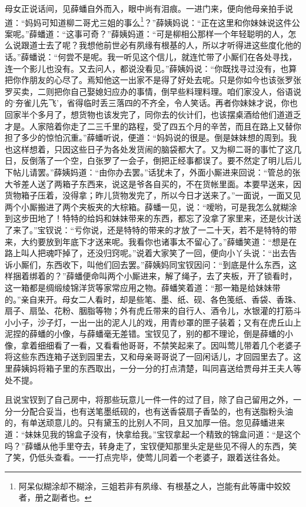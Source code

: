 \documentclass[12pt,oneside]{book}
\begin{document}
母女正说话间，见薛蟠自外而入，眼中尚有泪痕。一进门来，便向他母亲拍手说道：“妈妈可知道柳二哥尤三姐的事么\footnote{阿呆似糊涂却不糊涂，三姐若非有夙缘、有根基之人，岂能有此等庸中姣姣者，册之副者也。}？”薛姨妈说：“正在这里和你妹妹说这件公案呢。”薛蟠道：“这事可奇？”薛姨妈道：“可是柳相公那样一个年轻聪明的人，怎么说跟道士去了呢？我想他前世必有夙缘有根基的人，所以才听得进这些度化他的话。”薛蟠说：“何尝不是呢。我一听见这个信儿，就连忙带了小厮们在各处寻找，连一个影儿也没有。又去问人，都说没看见。”薛姨妈说：“你既找寻过没有，也算把你作朋友的心尽了。焉知他这一出家不是得了好处去呢。只是你如今也该张罗张罗买卖，二则把你自己娶媳妇应办的事情，倒早些料理料理。咱们家没人，俗语说的‘夯雀儿先飞’，省得临时丢三落四的不齐全，令人笑话。再者你妹妹才说，你也回家半个多月了，想货物也该发完了，同你去的伙计们，也该摆桌酒给他们道道乏才是。人家陪着你走了二三千里的路程，受了四五个月的辛苦，而且在路上又替你担了多少的惊怕沉重。”薛蟠听说，便道：“妈妈说的很是。倒是妹妹想的周到。我也这样想着，只因这些日子为各处发货闹的脑袋都大了。又为柳二哥的事忙了这几日，反倒落了一个空，白张罗了一会子，倒把正经事都误了。要不然定了明儿后儿下帖儿请罢。”薛姨妈道：“由你办去罢。”话犹未了，外面小厮进来回说：“管总的张大爷差人送了两箱子东西来，说这是爷各自买的，不在货帐里面。本要早送来，因货物箱子压着，没得拿；昨儿货物发完了，所以今日才送来了。”一面说，一面又见两个小厮搬进了两个夹板夹的大棕箱。薛蟠一见，说：“嗳哟，可是我怎么就糊涂到这步田地了！特特的给妈和妹妹带来的东西，都忘了没拿了家里来，还是伙计送了来了。”宝钗说：“亏你说，还是特特的带来的才放了一二十天，若不是特特的带来，大约要放到年底下才送来呢。我看你也诸事太不留心了。”薛蟠笑道：“想是在路上叫人把魂吓掉了，还没归窍呢。”说着大家笑了一回，便向小丫头说：“出去告诉小厮们，东西收下，叫他们回去罢。”薛姨妈同宝钗因问：“到底是什么东西，这样捆着绑着的？”薛蟠便命叫两个小厮进来，解了绳子，去了夹板，开了锁看时，这一箱都是绸缎绫锦洋货等家常应用之物。薛蟠笑着道：“那一箱是给妹妹带的。”亲自来开。母女二人看时，却是些笔、墨、纸、砚、各色笺纸、香袋、香珠、扇子、扇坠、花粉、胭脂等物；外有虎丘带来的自行人、酒令儿，水银灌的打筋斗小小子，沙子灯，一出一出的泥人儿的戏，用青纱罩的匣子装着；又有在虎丘山上泥捏的薛蟠的小像，与薛蟠毫无差错。宝钗见了，别的都不理论，倒是薛蟠的小像，拿着细细看了一看，又看看他哥哥，不禁笑起来了。因叫莺儿带着几个老婆子将这些东西连箱子送到园里去，又和母亲哥哥说了一回闲话儿，才回园里去了。这里薛姨妈将箱子里的东西取出，一分一分的打点清楚，叫同喜送给贾母并王夫人等处不提。

且说宝钗到了自己房中，将那些玩意儿一件一件的过了目，除了自己留用之外，一分一分配合妥当，也有送笔墨纸砚的，也有送香袋扇子香坠的，也有送脂粉头油的，有单送顽意儿的。只有黛玉的比别人不同，且又加厚一倍。忽见薛蟠进来道：“妹妹见我的锦盒子没有，快拿给我。”宝钗拿起一个精致的锦盒问道：“是这个吗？”薛蟠从他手里夺去，转身走了，宝钗便知那里头定是些见不得人的东西，笑了笑，仍低头查看。一一打点完毕，使莺儿同着一个老婆子，跟着送往各处。　　
\end{document}
